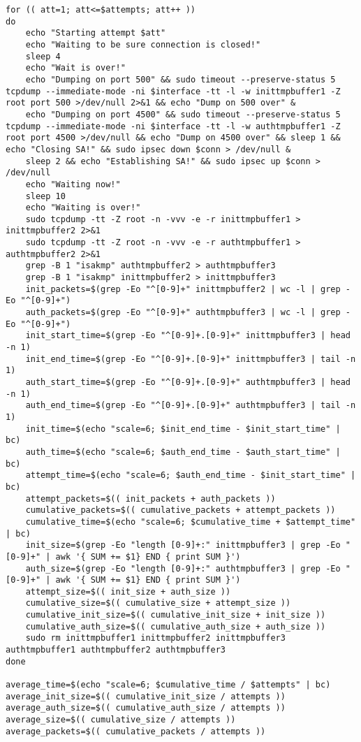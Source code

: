 \documentclass[
10pt, %
a4paper, %
oneside, %
headinclude,footinclude, %
BCOR5mm, %
]{scrartcl}
\begin{document}
\begin{lstlisting}
for (( att=1; att<=$attempts; att++ ))
do
    echo "Starting attempt $att"
    echo "Waiting to be sure connection is closed!"
    sleep 4
    echo "Wait is over!"
    echo "Dumping on port 500" && sudo timeout --preserve-status 5 tcpdump --immediate-mode -ni $interface -tt -l -w inittmpbuffer1 -Z root port 500 >/dev/null 2>&1 && echo "Dump on 500 over" &
    echo "Dumping on port 4500" && sudo timeout --preserve-status 5 tcpdump --immediate-mode -ni $interface -tt -l -w authtmpbuffer1 -Z root port 4500 >/dev/null && echo "Dump on 4500 over" && sleep 1 && echo "Closing SA!" && sudo ipsec down $conn > /dev/null &
    sleep 2 && echo "Establishing SA!" && sudo ipsec up $conn > /dev/null
    echo "Waiting now!"
    sleep 10
    echo "Waiting is over!"
    sudo tcpdump -tt -Z root -n -vvv -e -r inittmpbuffer1 > inittmpbuffer2 2>&1
    sudo tcpdump -tt -Z root -n -vvv -e -r authtmpbuffer1 > authtmpbuffer2 2>&1
    grep -B 1 "isakmp" authtmpbuffer2 > authtmpbuffer3
    grep -B 1 "isakmp" inittmpbuffer2 > inittmpbuffer3
    init_packets=$(grep -Eo "^[0-9]+" inittmpbuffer2 | wc -l | grep -Eo "^[0-9]+")
    auth_packets=$(grep -Eo "^[0-9]+" authtmpbuffer3 | wc -l | grep -Eo "^[0-9]+")
    init_start_time=$(grep -Eo "^[0-9]+.[0-9]+" inittmpbuffer3 | head -n 1)
    init_end_time=$(grep -Eo "^[0-9]+.[0-9]+" inittmpbuffer3 | tail -n 1)
    auth_start_time=$(grep -Eo "^[0-9]+.[0-9]+" authtmpbuffer3 | head -n 1)
    auth_end_time=$(grep -Eo "^[0-9]+.[0-9]+" authtmpbuffer3 | tail -n 1)
    init_time=$(echo "scale=6; $init_end_time - $init_start_time" | bc)
    auth_time=$(echo "scale=6; $auth_end_time - $auth_start_time" | bc)
    attempt_time=$(echo "scale=6; $auth_end_time - $init_start_time" | bc)
    attempt_packets=$(( init_packets + auth_packets ))
    cumulative_packets=$(( cumulative_packets + attempt_packets ))
    cumulative_time=$(echo "scale=6; $cumulative_time + $attempt_time" | bc)
    init_size=$(grep -Eo "length [0-9]+:" inittmpbuffer3 | grep -Eo "[0-9]+" | awk '{ SUM += $1} END { print SUM }')
    auth_size=$(grep -Eo "length [0-9]+:" authtmpbuffer3 | grep -Eo "[0-9]+" | awk '{ SUM += $1} END { print SUM }')
    attempt_size=$(( init_size + auth_size ))
    cumulative_size=$(( cumulative_size + attempt_size ))
    cumulative_init_size=$(( cumulative_init_size + init_size ))
    cumulative_auth_size=$(( cumulative_auth_size + auth_size ))
    sudo rm inittmpbuffer1 inittmpbuffer2 inittmpbuffer3 authtmpbuffer1 authtmpbuffer2 authtmpbuffer3
done

average_time=$(echo "scale=6; $cumulative_time / $attempts" | bc)
average_init_size=$(( cumulative_init_size / attempts ))
average_auth_size=$(( cumulative_auth_size / attempts ))
average_size=$(( cumulative_size / attempts ))
average_packets=$(( cumulative_packets / attempts ))


\end{lstlisting}
\end{document}
